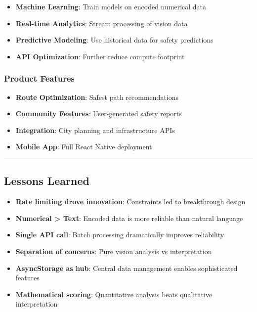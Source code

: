 \documentclass[
  letterpaper,
  DIV=11,
  numbers=noendperiod]{scrartcl}
\providecommand{\tightlist}{%
  \setlength{\itemsep}{0pt}\setlength{\parskip}{0pt}}
\begin{document}
\begin{itemize}
\tightlist
\item
  \textbf{Machine Learning}: Train models on encoded numerical data
\item
  \textbf{Real-time Analytics}: Stream processing of vision data
\item
  \textbf{Predictive Modeling}: Use historical data for safety
  predictions
\item
  \textbf{API Optimization}: Further reduce compute footprint
\end{itemize}

\subsubsection{Product Features}\label{product-features}

\begin{itemize}
\tightlist
\item
  \textbf{Route Optimization}: Safest path recommendations
\item
  \textbf{Community Features}: User-generated safety reports
\item
  \textbf{Integration}: City planning and infrastructure APIs
\item
  \textbf{Mobile App}: Full React Native deployment
\end{itemize}

\begin{center}\rule{0.5\linewidth}{0.5pt}\end{center}

\subsection{Lessons Learned}\label{lessons-learned}

\begin{itemize}
\tightlist
\item
  \textbf{Rate limiting drove innovation}: Constraints led to
  breakthrough design
\item
  \textbf{Numerical \textgreater{} Text}: Encoded data is more reliable
  than natural language
\item
  \textbf{Single API call}: Batch processing dramatically improves
  reliability
\item
  \textbf{Separation of concerns}: Pure vision analysis vs
  interpretation
\item
  \textbf{AsyncStorage as hub}: Central data management enables
  sophisticated features
\item
  \textbf{Mathematical scoring}: Quantitative analysis beats qualitative
  interpretation
\end{itemize}
\end{document}
